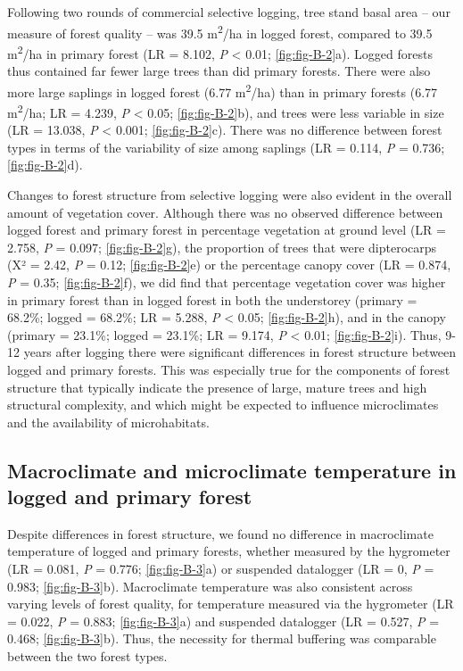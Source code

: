 \documentclass[12pt,a4paper,]{report}
\theoremstyle{definition}
\theoremstyle{definition}
\theoremstyle{definition}
\theoremstyle{remark}
\begin{document}
Following two rounds of commercial selective logging, tree stand basal
area -- our measure of forest quality -- was 39.5
m\textsuperscript{2}/ha in logged forest, compared to 39.5
m\textsuperscript{2}/ha in primary forest (LR = 8.102, \emph{P}
\textless{} 0.01; \autoref{fig:fig-B-2}a). Logged forests thus contained
far fewer large trees than did primary forests. There were also more
large saplings in logged forest (6.77 m\textsuperscript{2}/ha) than in
primary forests (6.77 m\textsuperscript{2}/ha; LR = 4.239, \emph{P}
\textless{} 0.05; \autoref{fig:fig-B-2}b), and trees were less variable
in size (LR = 13.038, \emph{P} \textless{} 0.001;
\autoref{fig:fig-B-2}c). There was no difference between forest types in
terms of the variability of size among saplings (LR = 0.114, \emph{P} =
0.736; \autoref{fig:fig-B-2}d).

Changes to forest structure from selective logging were also evident in
the overall amount of vegetation cover. Although there was no observed
difference between logged forest and primary forest in percentage
vegetation at ground level (LR = 2.758, \emph{P} = 0.097;
\autoref{fig:fig-B-2}g), the proportion of trees that were dipterocarps
(Χ² = 2.42, \emph{P} = 0.12; \autoref{fig:fig-B-2}e) or the percentage
canopy cover (LR = 0.874, \emph{P} = 0.35; \autoref{fig:fig-B-2}f), we
did find that percentage vegetation cover was higher in primary forest
than in logged forest in both the understorey (primary = 68.2\%; logged
= 68.2\%; LR = 5.288, \emph{P} \textless{} 0.05;
\autoref{fig:fig-B-2}h), and in the canopy (primary = 23.1\%; logged =
23.1\%; LR = 9.174, \emph{P} \textless{} 0.01; \autoref{fig:fig-B-2}i).
Thus, 9-12 years after logging there were significant differences in
forest structure between logged and primary forests. This was especially
true for the components of forest structure that typically indicate the
presence of large, mature trees and high structural complexity, and
which might be expected to influence microclimates and the availability
of microhabitats.

\subsection{Macroclimate and microclimate temperature in logged and
primary
forest}\label{macroclimate-and-microclimate-temperature-in-logged-and-primary-forest}

Despite differences in forest structure, we found no difference in
macroclimate temperature of logged and primary forests, whether measured
by the hygrometer (LR = 0.081, \emph{P} = 0.776; \autoref{fig:fig-B-3}a)
or suspended datalogger (LR = 0, \emph{P} = 0.983;
\autoref{fig:fig-B-3}b). Macroclimate temperature was also consistent
across varying levels of forest quality, for temperature measured via
the hygrometer (LR = 0.022, \emph{P} = 0.883; \autoref{fig:fig-B-3}a)
and suspended datalogger (LR = 0.527, \emph{P} = 0.468;
\autoref{fig:fig-B-3}b). Thus, the necessity for thermal buffering was
comparable between the two forest types.
\end{document}
